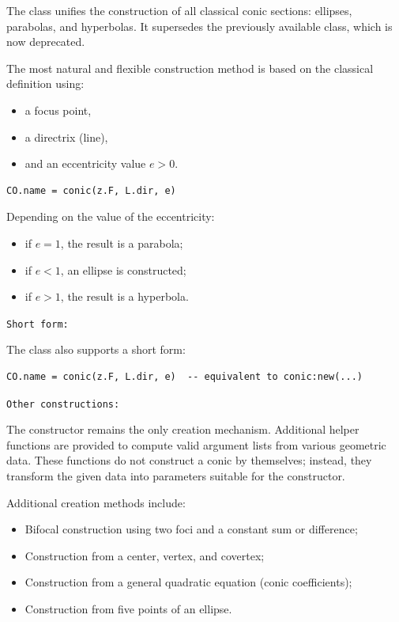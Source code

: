 The  class unifies the construction of all classical conic sections: ellipses, parabolas, and hyperbolas. It supersedes the previously available  class, which is now deprecated.

\vspace{1em}
The most natural and flexible construction method is based on the classical definition using:
\begin{itemize}
  \item a focus point,
  \item a directrix (line),
  \item and an eccentricity value \(e > 0\).
\end{itemize}

\begin{mybox}
\begin{verbatim}
CO.name = conic(z.F, L.dir, e)
\end{verbatim}
\end{mybox}

Depending on the value of the eccentricity:
\begin{itemize}
  \item if \(e = 1\), the result is a parabola;
  \item if \(e < 1\), an ellipse is constructed;
  \item if \(e > 1\), the result is a hyperbola.
\end{itemize}

\vspace{1em}
\texttt{Short form: }

The class also supports a short form:
\begin{mybox}
\begin{verbatim}
CO.name = conic(z.F, L.dir, e)  -- equivalent to conic:new(...)
\end{verbatim}
\end{mybox}

\texttt{Other constructions: }

The constructor  remains the only creation mechanism.
Additional helper functions are provided to compute valid argument lists
from various geometric data. These functions do not construct a conic by
themselves; instead, they transform the given data into parameters suitable
for the constructor.

Additional creation methods include:
\begin{itemize}
  \item Bifocal construction using two foci and a constant sum or difference;
  \item Construction from a center, vertex, and covertex;
  \item Construction from a general quadratic equation (conic coefficients);
  \item Construction from five points of an ellipse.
\end{itemize}



